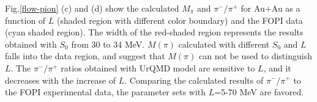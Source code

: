 \documentclass[reprint,aps,prc,twocolumn,superscriptaddress]{revtex4-1}
\begin{document}






Fig.\ref{flow-pion} (c) and (d) show the calculated $M_{\pi}$ and $\pi^-/\pi^+$ for Au+Au as a function of $L$ (shaded region with different color boundary) and the FOPI data (cyan shaded region). The width of the red-shaded region represents the results obtained with $S_0$ from 30 to 34 MeV. $M(\pi)$ calculated with different $S_0$ and $L$ falls into the data region, and suggest that $M(\pi)$ can not be used to distinguish $L$. The $\pi^-/\pi^+$ ratios obtained with UrQMD model are sensitive to $L$, and it decreases with the increase of $L$. %
Comparing the calculated results of $\pi^-/\pi^+$ to the FOPI experimental data, the parameter sets with $L$=5-70 MeV are favored.
\end{document}

